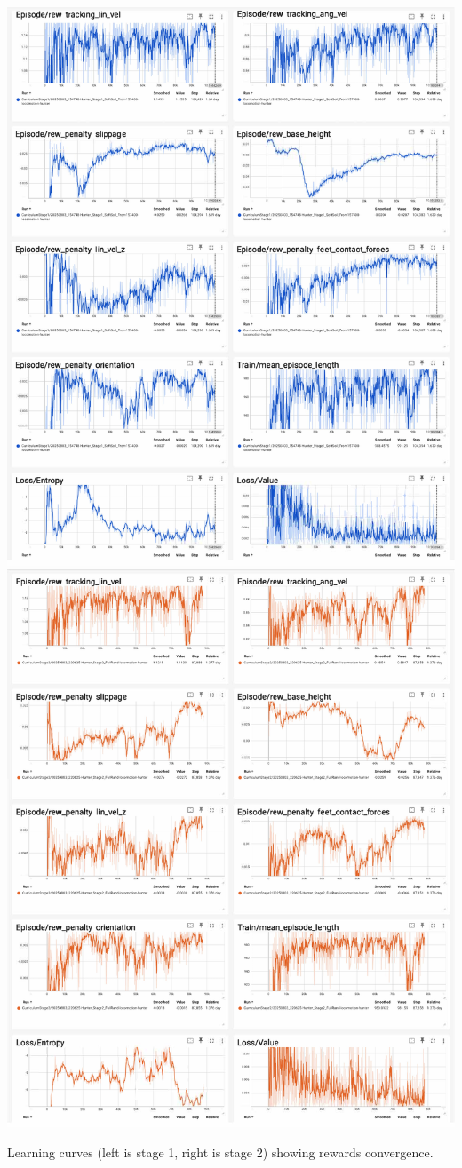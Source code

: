 \documentclass[a1paper,portrait,fontscale=0.5]{baposter}
\begin{document}
\begin{poster}
{\begin{center}
    \includegraphics[width=0.47\linewidth]{learning_curves_stage1}
    \includegraphics[width=0.47\linewidth]{learning_curves_stage2}
    
    \footnotesize{Learning curves (left is stage 1, right is stage 2) showing rewards convergence.}
\end{center}

}
\end{poster}
\end{document}
